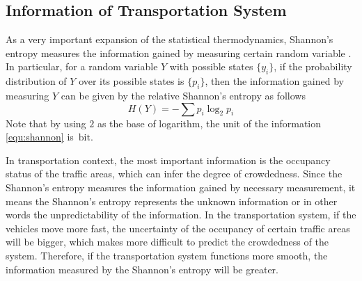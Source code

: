 \documentclass[preprint,authoryear,12pt]{elsarticle}
\newcommand{\unit}[1]{\,\mathrm{#1}}
\begin{document}
\subsection{Information of Transportation System}

As a very important expansion of the statistical thermodynamics,
Shannon's entropy measures the information gained by measuring
certain random variable \citep{Shannon1948}. In particular, for a
random variable $Y$ with possible states $\{y_i\}$, if the
probability distribution of $Y$ over its possible states is
$\{p_i\}$, then the information gained by measuring $Y$ can be given
by the relative Shannon's entropy as follows
\begin{equation}\label{equ:shannon}
H(Y) = -\sum p_i \log_2 p_i
\end{equation}
Note that by using $2$ as the base of logarithm, the unit of the
information \eqref{equ:shannon} is $\unit{bit}$.

In transportation context, the most important information is the
occupancy status of the traffic areas, which can infer the degree of
crowdedness. Since the Shannon's entropy measures the information
gained by necessary measurement, it means the Shannon's entropy
represents the unknown information or in other words the
unpredictability of the information. In the transportation system, if
the vehicles move more fast, the uncertainty of the occupancy of
certain traffic areas will be bigger, which makes more difficult to
predict the crowdedness of the system. Therefore, if the
transportation system functions more smooth, the information measured
by the Shannon's entropy will be greater.
\end{document}
